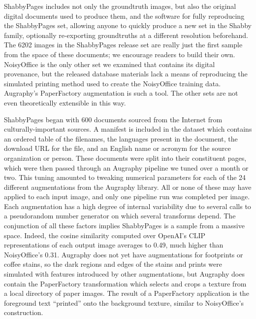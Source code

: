 \documentclass[runningheads]{llncs}
\begin{document}
ShabbyPages includes not only the groundtruth images, but also the original digital documents used to produce them, and the software for fully reproducing the ShabbyPages set, allowing anyone to quickly produce a new set in the Shabby family, optionally re-exporting groundtruths at a different resolution beforehand.
The 6202 images in the ShabbyPages release set are really just the first sample from the space of these documents; we encourage readers to build their own.
NoisyOffice is the only other set we examined that contains its digital provenance, but the released database materials lack a means of reproducing the simulated printing method used to create the NoisyOffice training data.
Augraphy's PaperFactory augmentation is such a tool.
The other sets are not even theoretically extensible in this way.


ShabbyPages began with 600 documents sourced from the Internet from culturally-important sources.
A manifest is included in the dataset which contains an ordered table of the filenames, the languages present in the document, the download URL for the file, and an English name or acronym for the source organization or person.
These documents were split into their constituent pages, which were then passed through an Augraphy pipeline we tuned over a month or two.
This tuning amounted to tweaking numerical parameters for each of the 24 different augmentations from the Augraphy library.
All or none of these may have applied to each input image, and only one pipeline run was completed per image.
Each augmentation has a high degree of internal variability due to several calls to a pseudorandom number generator on which several transforms depend.
The conjunction of all these factors implies ShabbyPages is a sample from a massive space.
Indeed, the cosine similarity computed over OpenAI's CLIP representations of each output image averages to 0.49, much higher than NoisyOffice's 0.31.
Augraphy does not yet have augmentations for footprints or coffee stains, so the dark regions and edges of the stains and prints were simulated with features introduced by other augmentations, but Augraphy does contain the PaperFactory transformation which selects and crops a texture from a local directory of paper images.
The result of a PaperFactory application is the foreground text ``printed'' onto the background texture, similar to NoisyOffice's construction.
\end{document}
